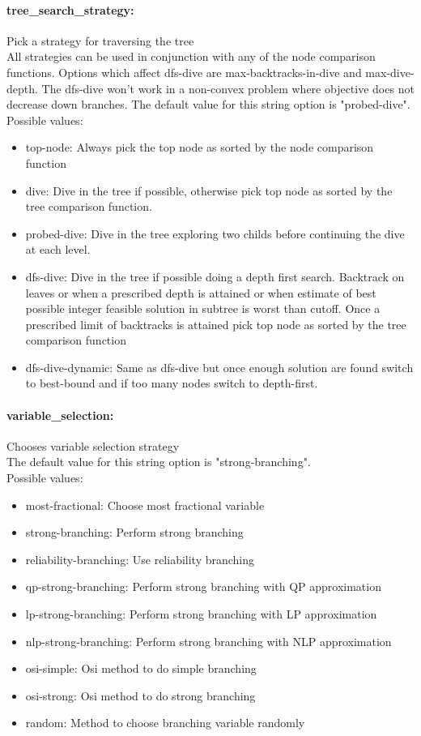 \paragraph{tree\_search\_strategy:}\label{sec:tree_search_strategy} Pick a strategy for traversing the tree $\;$ \\
 All strategies can be used in conjunction with
any of the node comparison functions. Options
which affect dfs-dive are max-backtracks-in-dive
and max-dive-depth. The dfs-dive won't work in a
non-convex problem where objective does not
decrease down branches.
The default value for this string option is "probed-dive".
\\ 
Possible values:
\begin{itemize}
   \item top-node:  Always pick the top node as sorted by the node
comparison function
   \item dive: Dive in the tree if possible, otherwise pick
top node as sorted by the tree comparison
function.
   \item probed-dive: Dive in the tree exploring two childs before
continuing the dive at each level.
   \item dfs-dive: Dive in the tree if possible doing a depth
first search. Backtrack on leaves or when a
prescribed depth is attained or when estimate
of best possible integer feasible solution in
subtree is worst than cutoff. Once a prescribed
limit of backtracks is attained pick top node
as sorted by the tree comparison function
   \item dfs-dive-dynamic: Same as dfs-dive but once enough solution are
found switch to best-bound and if too many
nodes switch to depth-first.
\end{itemize}

\paragraph{variable\_selection:}\label{sec:variable_selection} Chooses variable selection strategy $\;$ \\

The default value for this string option is "strong-branching".
\\ 
Possible values:
\begin{itemize}
   \item most-fractional: Choose most fractional variable
   \item strong-branching: Perform strong branching
   \item reliability-branching: Use reliability branching
   \item qp-strong-branching: Perform strong branching with QP approximation
   \item lp-strong-branching: Perform strong branching with LP approximation
   \item nlp-strong-branching: Perform strong branching with NLP approximation
   \item osi-simple: Osi method to do simple branching
   \item osi-strong: Osi method to do strong branching
   \item random: Method to choose branching variable randomly
\end{itemize}

